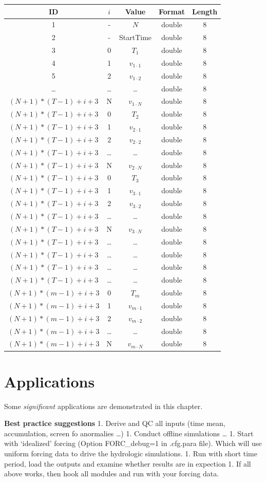 \documentclass[
]{scrbook}
\begin{document}
\begin{longtable}[]{@{}ccccc@{}}
\toprule
ID & \(i\) & Value & Format & Length\tabularnewline
\midrule
\endhead
1 & - & \(N\) & double & 8\tabularnewline
2 & - & StartTime & double & 8\tabularnewline
3 & 0 & \(T_1\) & double & 8\tabularnewline
4 & 1 & \(v_{1 \cdot 1}\) & double & 8\tabularnewline
5 & 2 & \(v_{1 \cdot 2}\) & double & 8\tabularnewline
\ldots{} & \ldots{} & \ldots{} & double & 8\tabularnewline
\((N+1) * (T-1) + i +3\) & N & \(v_{1 \cdot N}\) & double & 8\tabularnewline
\((N+1) * (T-1) + i +3\) & 0 & \(T_2\) & double & 8\tabularnewline
\((N+1) * (T-1) + i +3\) & 1 & \(v_{2 \cdot 1}\) & double & 8\tabularnewline
\((N+1) * (T-1) + i +3\) & 2 & \(v_{2 \cdot 2}\) & double & 8\tabularnewline
\((N+1) * (T-1) + i +3\) & \ldots{} & \ldots{} & double & 8\tabularnewline
\((N+1) * (T-1) + i +3\) & N & \(v_{2 \cdot N}\) & double & 8\tabularnewline
\((N+1) * (T-1) + i +3\) & 0 & \(T_3\) & double & 8\tabularnewline
\((N+1) * (T-1) + i +3\) & 1 & \(v_{3 \cdot 1}\) & double & 8\tabularnewline
\((N+1) * (T-1) + i +3\) & 2 & \(v_{3 \cdot 2}\) & double & 8\tabularnewline
\((N+1) * (T-1) + i +3\) & \ldots{} & \ldots{} & double & 8\tabularnewline
\((N+1) * (T-1) + i +3\) & N & \(v_{3 \cdot N}\) & double & 8\tabularnewline
\((N+1) * (T-1) + i +3\) & \ldots{} & \ldots{} & double & 8\tabularnewline
\((N+1) * (T-1) + i +3\) & \ldots{} & \ldots{} & double & 8\tabularnewline
\((N+1) * (T-1) + i +3\) & \ldots{} & \ldots{} & double & 8\tabularnewline
\((N+1) * (T-1) + i +3\) & \ldots{} & \ldots{} & double & 8\tabularnewline
\((N+1) * (m-1) + i +3\) & 0 & \(T_{m}\) & double & 8\tabularnewline
\((N+1) * (m-1) + i +3\) & 1 & \(v_{m \cdot 1}\) & double & 8\tabularnewline
\((N+1) * (m-1) + i +3\) & 2 & \(v_{m \cdot 2}\) & double & 8\tabularnewline
\((N+1) * (m-1) + i +3\) & \ldots{} & \ldots{} & double & 8\tabularnewline
\((N+1) * (m-1) + i +3\) & N & \(v_{m \cdot N}\) & double & 8\tabularnewline
\bottomrule
\end{longtable}

\hypertarget{applications}{%
\chapter{Applications}\label{applications}}

Some \emph{significant} applications are demonstrated in this chapter.

\textbf{Best practice suggestions}
1. Derive and QC all inputs (time mean, accumulation, screen fo anormalies \ldots)
1. Conduct offline simulations \ldots{}
1. Start with `idealized' forcing (Option FORC\_debug=1 in .cfg.para file). Which will use uniform forcing data to drive the hydrologic simulations.
1. Run with short time period, load the outputs and examine whether results are in expection
1. If all above works, then hook all modules and run with your forcing data.
\end{document}
